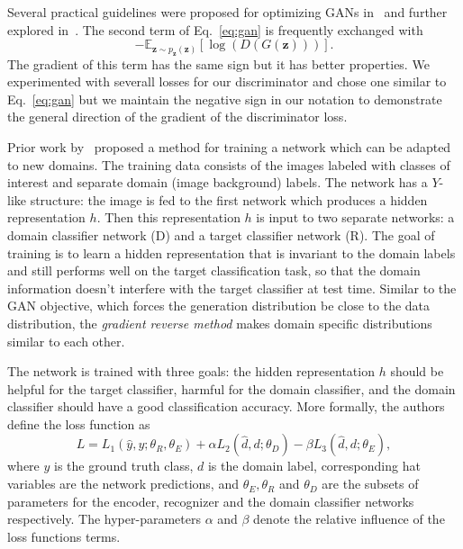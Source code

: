 \documentclass[a4paper]{article}
\begin{document}
    Several practical guidelines were proposed for optimizing GANs in~\cite{radford2015unsupervised} and 
    further explored in~\cite{salimans2016improved}. The second term of Eq.~\ref{eq:gan}
    is frequently exchanged with
    \begin{equation}
        - \mathbb{E}_{\bm{z} \sim p_{\bm{z}}(\bm{z})}[\log (D(G(\bm{z})))].
    \end{equation}
    The gradient of this term has the same sign but it has better properties.
    We experimented with severall losses for our discriminator and chose one
    similar to Eq.~\ref{eq:gan} but we maintain the negative sign in our notation
    to demonstrate the general direction of the gradient of the discriminator loss.
    
    Prior work by~\cite{ganin2014unsupervised} proposed a method for training a network 
    which can be adapted to new domains. The training data consists of the images
    labeled with classes of interest and separate domain (image background) labels. 
    The network has a $Y$-like structure: the image is fed to the
    first network which produces a hidden representation $h$. Then this 
    representation $h$ is input to two separate networks: a domain classifier network (D) and 
    a target classifier network (R). The goal of training is to learn a hidden 
    representation that is invariant to the domain labels and still performs well on 
    the target classification task, so that the domain information doesn't 
    interfere with the target classifier at test time. Similar to the GAN 
    objective, which forces the generation distribution be close to the data distribution,
    the \emph{gradient reverse method} makes domain specific distributions similar to each other.

    The network is trained with three goals: the hidden representation $h$ should
    be helpful for the target classifier, harmful for the domain classifier,
    and the domain classifier should have a good classification accuracy. More 
    formally, the authors define the loss function as
    \begin{equation}
        L = L_1(\hat{y}, y; \theta_R, \theta_E) + 
        \alpha L_2(\hat{d}, d; \theta_D) -
        \beta L_3(\hat{d}, d; \theta_E),
        \label{eq:grm}
    \end{equation}
    where $y$ is the ground truth class, $d$ is the domain label, corresponding
    hat variables are the network predictions, and $\theta_E, \theta_R$ and 
    $\theta_D$ are the subsets of  parameters for the encoder,
    recognizer and the domain classifier networks respectively. The hyper-parameters
    $\alpha$ and $\beta$ denote the relative influence of the loss functions terms.
\end{document}
